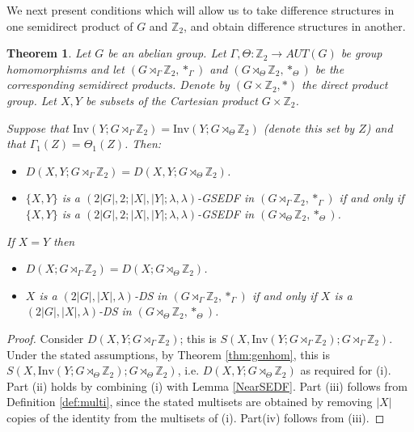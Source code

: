 \documentclass[12pt, a4paper]{article}
\newtheorem{theorem}{Theorem}[section]
\theoremstyle{definition}
\begin{document}
We next present conditions which will allow us to take  difference structures in one semidirect product of $G$ and $\mathbb{Z}_2$, and obtain difference structures in another.

\begin{theorem}\label{thm:StoD}
Let $G$ be an abelian group. Let $\Gamma, \Theta: \mathbb{Z}_2 \rightarrow AUT(G)$ be group homomorphisms and let $(G \rtimes_{\Gamma} \mathbb{Z}_2,*_{\Gamma})$ and $(G \rtimes_{\Theta} \mathbb{Z}_2,*_{\Theta})$ be the corresponding semidirect products. Denote by $(G \times \mathbb{Z}_2,*)$ the direct product group. Let $X,Y$ be subsets of the Cartesian product $G \times \mathbb{Z}_2$.

Suppose that $\mathrm{Inv}(Y;G \rtimes_{\Gamma} \mathbb{Z}_2)=\mathrm{Inv}(Y;G \rtimes_{\Theta} \mathbb{Z}_2)$ (denote this set by $Z$) and that $\Gamma_1(Z)=\Theta_1(Z)$.  Then:  
\begin{itemize}
\item[(i)] $D(X, Y;  G \rtimes_{\Gamma} \mathbb{Z}_2)= D(X,Y; G \rtimes_{\Theta} \mathbb{Z}_2)$.
\item[(ii)]$\{X,Y\}$ is a $(2|G|,2;|X|,|Y|;\lambda,\lambda)$-GSEDF in $(G \rtimes_{\Gamma} \mathbb{Z}_2,*_{\Gamma})$ if and only if $\{X,Y\}$ is a $(2|G|,2;|X|,|Y|;\lambda,\lambda)$-GSEDF in $(G \rtimes_{\Theta} \mathbb{Z}_2,*_{\Theta})$. 
\end{itemize}
If $X=Y$ then
\begin{itemize}
\item[(iii)] $D(X;  G \rtimes_{\Gamma} \mathbb{Z}_2)= D(X; G \rtimes_{\Theta} \mathbb{Z}_2)$.
\item[(iv)] $X$ is a $(2|G|,|X|,\lambda)$-DS in $(G \rtimes_{\Gamma} \mathbb{Z}_2,*_{\Gamma})$ if and only if $X$ is a $(2|G|,|X|,\lambda)$-DS in $(G \rtimes_{\Theta} \mathbb{Z}_2,*_{\Theta})$.
\end{itemize}
\end{theorem}
\begin{proof}
Consider $D(X, Y;  G \rtimes_{\Gamma} \mathbb{Z}_2)$; this is $S(X,\mathrm{Inv}(Y;G \rtimes_{\Gamma} \mathbb{Z}_2);  G \rtimes_{\Gamma} \mathbb{Z}_2)$.  Under the stated assumptions, by Theorem \ref{thm:genhom}, this is $S(X,\mathrm{Inv}(Y;G \rtimes_{\Theta} \mathbb{Z}_2);  G \rtimes_{\Theta} \mathbb{Z}_2)$, i.e. $D(X,Y; G \rtimes_{\Theta} \mathbb{Z}_2)$ as required for (i).  Part (ii) holds by combining (i) with Lemma \ref{NearSEDF}. Part (iii) follows from Definition \ref{def:multi}, since the stated multisets are obtained by removing $|X|$ copies of the identity from the multisets of (i). Part(iv) follows from (iii).
\end{proof}
\end{document}

